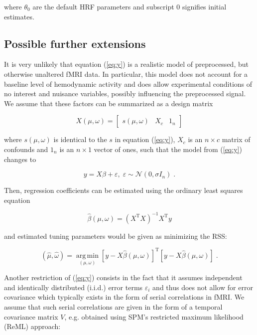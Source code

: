 \documentclass[a4paper,12pt]{article}
\begin{document}
where $\theta_0$ are the default HRF parameters and subscript 0 signifies initial estimates.


\subsection{Possible further extensions}

It is very unlikely that equation (\ref{eq:y}) is a realistic model of preprocessed, but otherwise unaltered fMRI data. In particular, this model does not account for a baseline level of hemodynamic activity and does allow experimental conditions of no interest and nuisance variables, possibly influencing the preprocessed signal. We assume that these factors can be summarized as a design matrix

\begin{equation} \label{eq:X}
X(\mu,\omega) = \left[ \begin{matrix} s(\mu,\omega) & X_c & 1_n \end{matrix} \right]
\end{equation}

where $s(\mu,\omega)$ is identical to the $s$ in equation (\ref{eq:y}), $X_c$ is an $n \times c$ matrix of confounds and $1_n$ is an $n \times 1$ vector of ones, such that the model from (\ref{eq:y}) changes to

\begin{equation} \label{eq:y-X}
y = X \beta + \varepsilon, \; \varepsilon \sim \mathcal{N}(0, \sigma I_n) \; .
\end{equation}

Then, regression coefficients can be estimated using the ordinary least squares equation

\begin{equation} \label{eq:b-est-X}
\hat{\beta}(\mu,\omega) = (X^\mathrm{T} X)^{-1} X^\mathrm{T} y
\end{equation}

and estimated tuning parameters would be given as minimizing the RSS:

\begin{equation} \label{eq:mu-tw-est-X}
(\hat{\mu},\hat{\omega}) = \operatorname*{arg\,min}_{(\mu,\omega)} \left[ y - X \hat{\beta}(\mu,\omega) \right]^\mathrm{T} \left[ y - X \hat{\beta}(\mu,\omega) \right] \; .
\end{equation}

Another restriction of (\ref{eq:y}) consists in the fact that it assumes independent and identically distributed (i.i.d.) error terms $\varepsilon_i$ and thus does not allow for error covariance which typically exists in the form of serial correlations in fMRI. We assume that such serial correlations are given in the form of a temporal covariance matrix $V$, e.g. obtained using SPM's restricted maximum likelihood (ReML) approach:
\end{document}
